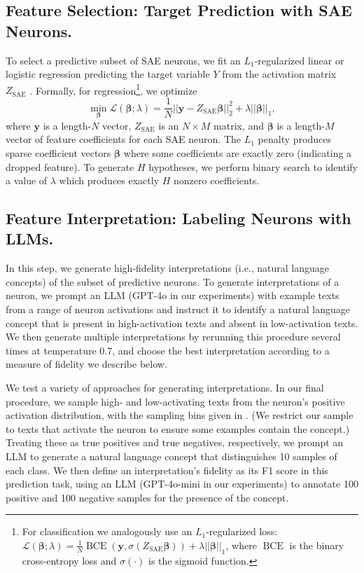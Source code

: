 \subsection{Feature Selection: Target Prediction with SAE Neurons.}
To select a predictive subset of SAE neurons, we fit an $L_1$-regularized linear or logistic regression predicting the target variable $Y$ from the activation matrix $Z_{\text{SAE}}$ \cite{tibshirani_regression_1996}. 
Formally, for regression\footnote{For classification we analogously use an $L_1$-regularized loss: $\mathcal{L}(\bm{\beta}; \lambda) = \frac{1}{N} \operatorname{BCE}(\mathbf{y}, \sigma(Z_{\text{SAE}}\bm{\beta})) + \lambda ||\bm{\beta}||_1$, where $\operatorname{BCE}$ is the binary cross-entropy loss and $\sigma(\cdot)$ is the sigmoid function.}, we optimize $$\min_{\bm{\beta}} \mathcal{L}(\bm{\beta}; \lambda) = \frac{1}{N} \left||\mathbf{y} - Z_{\text{SAE}}\bm{\beta}|\right|^2_2 + \lambda ||\bm{\beta}||_1,$$ where $\mathbf{y}$ is a length-$N$ vector, $Z_{\text{SAE}}$ is an $N \times M$ matrix, and $\bm{\beta}$ is a length-$M$ vector of feature coefficients for each SAE neuron.
The $L_1$ penalty produces sparse coefficient vectors $\bm{\beta}$ where some coefficients are exactly zero (indicating a dropped feature). 
To generate $H$ hypotheses, we perform binary search to identify a value of $\lambda$ which produces exactly $H$ nonzero coefficients.

\subsection{Feature Interpretation: Labeling Neurons with LLMs.}\label{sec:methods-interpretations}

In this step, we generate high-fidelity interpretations (i.e., natural language concepts) of the subset of predictive neurons. 
To generate interpretations of a neuron, we prompt an LLM (GPT-4o in our experiments) with example texts from a range of neuron activations and instruct it to identify a natural language concept that is present in high-activation texts and absent in low-activation texts. We then generate multiple interpretations by rerunning this procedure several times at temperature 0.7, and choose the best interpretation according to a measure of fidelity we describe below.

We test a variety of approaches for generating interpretations. In our final procedure, we sample high- and low-activating texts from the neuron's positive activation distribution, with the sampling bins given in . 
(We restrict our sample to texts that activate the neuron to ensure some examples contain the concept.) 
Treating these as true positives and true negatives, respectively, we prompt an LLM to generate a natural language concept that distinguishes 10 samples of each class. 
We then define an interpretation's fidelity as its F1 score in this prediction task, using an LLM (GPT-4o-mini in our experiments) to annotate 100 positive and 100 negative samples for the presence of the concept. 

